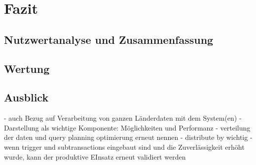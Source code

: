 \chapter{Fazit}
\section{Nutzwertanalyse und Zusammenfassung}


\section{Wertung}

\section{Ausblick}

- auch Bezug auf Verarbeitung von ganzen Länderdaten mit dem System(en)
- Darstellung als wichtige Komponente: Möglichkeiten und Performanz
- verteilung der daten und query planning optimierung erneut nennen
- distribute by wichtig
- wenn trigger und subtransactions eingebaut sind und die Zuverlässigkeit erhöht wurde, kann der produktive EInsatz erneut validiert werden




\label{LastPage}